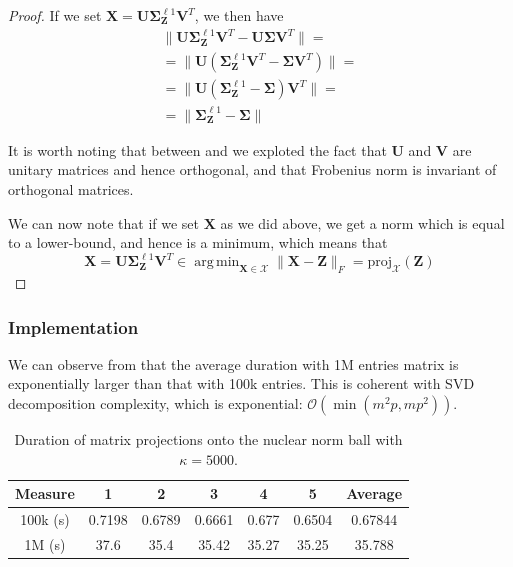 \documentclass[12pt]{article}
\DeclareMathOperator*{\argmin}{arg\,min}
\newcommand{\boldZ}{\mathbf{Z}}
\newcommand{\boldX}{\mathbf{X}}
\newcommand{\boldU}{\mathbf{U}}
\newcommand{\boldV}{\mathbf{V}}
\newcommand{\setX}{\mathcal{X}}
\newcommand{\boldS}{\mathbf{\Sigma}}
\newcommand*{\proj}{\text{proj}}
\begin{document}
\begin{proof}
If we set $\boldX = \boldU \boldS_{\boldZ}^{\ell1} \boldV^T$, we then have
\begin{gather}
    \lVert \boldU \boldS_{\boldZ}^{\ell1} \boldV^T - \boldU \boldS \boldV^T \rVert = \\
    = \lVert \boldU (\boldS_{\boldZ}^{\ell1} \boldV^T - \boldS \boldV^T) \rVert = \\
    = \lVert \boldU (\boldS_{\boldZ}^{\ell1} - \boldS) \boldV^T \rVert = \label{eq:frob-invariance-1} \\
    = \lVert \boldS_{\boldZ}^{\ell1} - \boldS \rVert \label{eq:frob-invariance-2}
\end{gather}

It is worth noting that between  and  we exploted the fact that $\boldU$ and $\boldV$ are unitary matrices and hence orthogonal, and that Frobenius norm is invariant of orthogonal matrices.

We can now note that if we set $\boldX$ as we did above, we get a norm which is equal to a lower-bound, and hence is a minimum, which means that
\begin{equation}
    \boldX = \boldU \boldS_{\boldZ}^{\ell1} \boldV^T \in \argmin_{\boldX \in \setX} \lVert \boldX - \boldZ \rVert_{F} = \proj_{\setX}(\boldZ)
\end{equation}
\end{proof}

\subsubsection{Implementation}
We can observe from  that the average duration with 1M entries matrix is exponentially larger than that with 100k entries. This is coherent with SVD decomposition complexity, which is exponential: $\mathcal{O}(\min(m^2p, mp^2))$.

\begin{table}[ht]
\centering
\caption{Duration of matrix projections onto the nuclear norm ball with $\kappa = 5000$.}
\label{tab:projections}
\begin{tabular}{ccccccc}
Measure & 1 & 2 & 3 & 4 & 5 & Average \\ \hline
100k (s) & 0.7198 & 0.6789 & 0.6661 & 0.677 & 0.6504 & 0.67844 \\ \hline
1M (s) & 37.6 & 35.4 & 35.42 & 35.27 & 35.25 & 35.788
\end{tabular}
\end{table}
\end{document}
